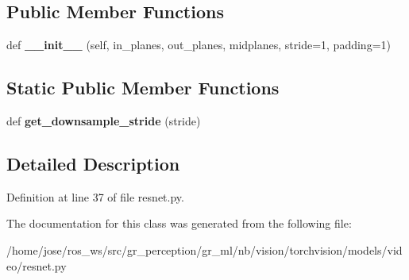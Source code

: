 \subsection*{Public Member Functions}
\begin{DoxyCompactItemize}
\item 
\mbox{\label{classtorchvision_1_1models_1_1video_1_1resnet_1_1Conv2Plus1D_a8258cd2f4e94740fc52aa945ae4dcb95}} 
def {\bfseries \+\_\+\+\_\+init\+\_\+\+\_\+} (self, in\+\_\+planes, out\+\_\+planes, midplanes, stride=1, padding=1)
\end{DoxyCompactItemize}
\subsection*{Static Public Member Functions}
\begin{DoxyCompactItemize}
\item 
\mbox{\label{classtorchvision_1_1models_1_1video_1_1resnet_1_1Conv2Plus1D_a02ceae9fa517251f8ac4d82e56b7ac12}} 
def {\bfseries get\+\_\+downsample\+\_\+stride} (stride)
\end{DoxyCompactItemize}


\subsection{Detailed Description}


Definition at line 37 of file resnet.\+py.



The documentation for this class was generated from the following file\+:\begin{DoxyCompactItemize}
\item 
/home/jose/ros\+\_\+ws/src/gr\+\_\+perception/gr\+\_\+ml/nb/vision/torchvision/models/video/resnet.\+py\end{DoxyCompactItemize}
